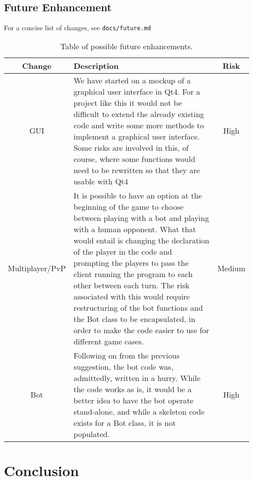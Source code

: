 \documentclass[12pt,a4paper,tightenlines]{article}
\begin{document}
\newpage
\subsection{Future Enhancement}
For a concise list of changes, see \texttt{docs/future.md}
\begin{table}[!ht]
    \begin{tabular}{|c|m{10cm}|c|}
        \hline
        Change & Description & Risk\\
        \hline
        GUI & We have started on a mockup of a graphical user interface
        in Qt4. For a project like this it would not be difficult
        to extend the already existing code and write some more
        methods to implement a graphical user interface. Some risks are 
        involved in this, of course, where some functions would need to be
        rewritten so that they are usable with Qt4 & 
        \cellcolor{red!50}High \\
        \hline
        Multiplayer/PvP & It is possible to have an option at the 
        beginning of the game to choose between playing with a bot
        and playing with a human opponent. What that would entail
        is changing the declaration of the player in the code and
        prompting the players to pass the client running the program
        to each other between each turn. The risk associated with this
        would require restructuring of the bot functions and the 
        Bot class to be encapsulated, in order to make the code easier
        to use for different game cases. & \cellcolor{yellow!50} Medium\\
        \hline
        Bot & Following on from the previous suggestion, the bot code was,
        admittedly, written in a hurry. While the code works as is, 
        it would be a better idea to have the bot operate 
        stand-alone, and while a skeleton code exists for a Bot
        class, it is not populated. & \cellcolor{red!50} High\\
        \hline
    \end{tabular}
    \caption{Table of possible future enhancements.}
\end{table}

\section{Conclusion}


%
\newpage
\end{document}
